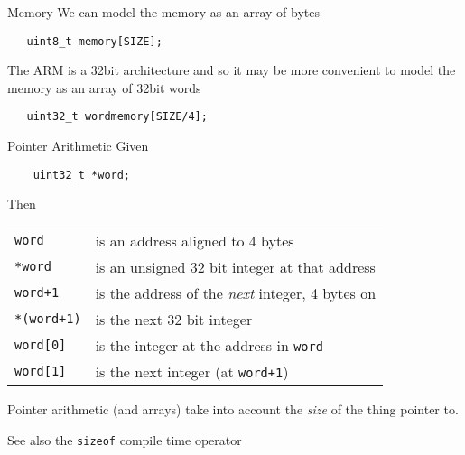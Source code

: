 \documentclass[xcolor=svgnames]{beamer}
\begin{document}
\begin{frame}[fragile]{Memory}
    We can model the memory as an array of bytes
    \begin{tcolorbox}
        \begin{verbatim}
   uint8_t memory[SIZE];
        \end{verbatim}
    \end{tcolorbox}
    The ARM is a 32bit architecture and so it may be more
    convenient to model the memory as an array of 32bit words
    \begin{tcolorbox}
        \begin{verbatim}
   uint32_t wordmemory[SIZE/4];
        \end{verbatim}
    \end{tcolorbox}

\end{frame}

\begin{frame}[fragile]{Pointer Arithmetic}
Given
\begin{verbatim}
    uint32_t *word;
\end{verbatim}
Then\\
\begin{tabular}{ll}
    \texttt{word} & is an address aligned to 4 bytes \\
    \texttt{*word} & is an unsigned 32 bit integer at that address \\
    \texttt{word+1} & is the address of the \emph{next} integer, \alert{4 bytes on} \\
    \texttt{*(word+1)} & is the \alert{next} 32 bit integer\\
    \texttt{word[0]} & is the integer \alert{at} the address in \texttt{word}\\
    \texttt{word[1]} & is the next integer (at \texttt{word+1})
\end{tabular}
Pointer arithmetic (and arrays) take into account the \emph{size} of the thing pointer to.

\begin{exampleblock}{See also}
    the \texttt{sizeof} compile time operator
\end{exampleblock}
\end{frame}
\end{document}
